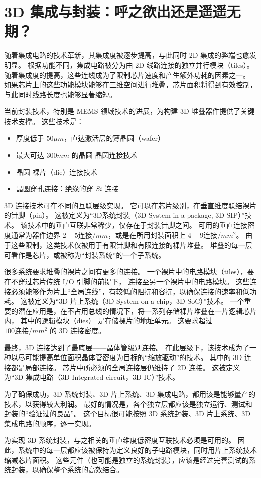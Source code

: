 
\chapter{3D 集成与封装：呼之欲出还是遥遥无期？}

随着集成电路的技术革新，其集成度被逐步提高，与此同时 2D 集成的弊端也愈发明显。
根据功能不同，集成电路被分为由 2D 线路连接的独立并行模块（tiles）。
随着集成度的提高，这些连线成为了限制芯片速度和产生额外功耗的因素之一。
如果芯片上的这些功能模块能够在三维空间进行堆叠，芯片面积将得到有效控制，
与此同时线路长度也能够显著缩短。

当前封装技术，特别是 MEMS 领域技术的进展，为构建 3D 堆叠器件提供了关键技术支撑。
这些技术是：
\begin{itemize}
    \item 厚度低于 $50 \mu m$，直达激活层的薄晶圆（wafer）
    \item 最大可达 $300 mm$ 的晶圆-晶圆连接技术
    \item 晶圆-裸片（die）连接技术
    \item 晶圆穿孔连接：绝缘的穿 $Si$ 连接
\end{itemize}

3D 连接技术可在不同的互联层级实现。
它可以在芯片级别，在垂直维度联结裸片的针脚（pin）。
这被定义为“3D系统封装（3D-System-in-a-package, 3D-SIP）”技术。
该技术中的垂直互联非常稀少，仅存在于封装针脚之间。
可用的垂直连接密度通常为器件边界 $2-5\textrm{连接}/mm$，或是在所用封装面积上
 $4-9\textrm{连接}/mm^2$。
由于这些限制，这类技术仅被用于有限针脚和有限连接的裸片堆叠。
堆叠的每一层可看作是芯片，或被称为“封装系统”的一个子系统。

很多系统要求堆叠的裸片之间有更多的连接。
一个裸片中的电路模块（tiles），要在不穿过芯片传统 I/O 引脚的前提下，
连接至另一个裸片中的电路模块。
这些连接必须能够作为片上“全局连线”，有较低的阻抗和容抗，以确保连接的速率和低功耗。
这被定义为“3D 片上系统（3D-System-on-a-chip，3D-SoC）”技术。
一个重要的潜在应用是，在不占用总线的情况下，将一系列存储裸片堆叠在一片逻辑芯片内，
其中的逻辑模块（dies） 是存储裸片的地址单元。
这要求超过 $100\textrm{连接}/mm^2$ 的 3D 连接密度。

最终，3D 连接达到了最底层——晶体管级别连接。
在此层级下，该技术成为了一种以尽可能提高单位面积晶体管密度为目标的“缩放驱动”的技术。
其中的 3D 连接都是局部连接。
芯片中所必须的全局连接层仍维持了 2D 连接。
这被定义为“3D 集成电路（3D-Integrated-circuit，3D-IC）”技术。

为了确保成功，3D 系统封装、3D 片上系统、3D 集成电路，都用该是能够量产的技术，以获得较大利润。
最好的情况是，各个独立层都应该是独立运行、测试和封装的“验证过的良品”。
这个目标很可能按照 3D 系统封装、3D 片上系统、3D 集成电路的顺序，逐一实现。

为实现 3D 系统封装，与之相关的垂直维度低密度互联技术必须是可用的。
因此，系统中的每一层都应该被保持为定义良好的子电路模块，同时用片上系统技术缩减芯片面积。
这些元件（也可能是独立的系统封装），应该是经过完善测试的系统封装，以确保整个系统的高效结合。
